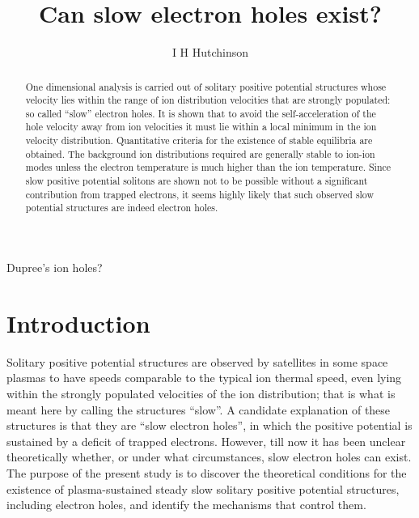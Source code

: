 \documentclass[12pt]{article}
\title{Can slow electron holes exist?}
\author{I H Hutchinson}
\begin{document}
\maketitle
\begin{abstract}
  One dimensional analysis is carried out of solitary positive
  potential structures whose velocity lies within the range of ion
  distribution velocities that are strongly populated: so called
  ``slow'' electron holes. It is shown that to avoid the
  self-acceleration of the hole velocity away from ion velocities it
  must lie within a local minimum in the ion velocity distribution.
  Quantitative criteria for the existence of stable equilibria are
  obtained. The background ion distributions required are generally
  stable to ion-ion modes unless the electron temperature is much
  higher than the ion temperature. Since slow positive potential
  solitons are shown not to be possible without a significant
  contribution from trapped electrons, it seems highly likely that
  such observed slow potential structures are indeed electron holes.
\end{abstract}

Dupree's ion holes?


\section{Introduction}

Solitary positive potential structures are observed by satellites in
some space plasmas to have speeds comparable to the typical ion
thermal speed, even lying within the strongly populated velocities of
the ion distribution\cite{Graham2016,Steinvall2019,Lotekar2020}; that is what is
meant here by calling the structures ``slow''. A candidate explanation
of these structures is that they are ``slow electron holes'', in which
the positive potential is sustained by a deficit of trapped
electrons. However, till now it has been unclear theoretically
whether, or under what circumstances, slow electron holes can
exist. The purpose of the present study is to discover the theoretical
conditions for the existence of plasma-sustained steady slow solitary
positive potential structures, including electron holes, and identify
the mechanisms that control them.
\end{document}
